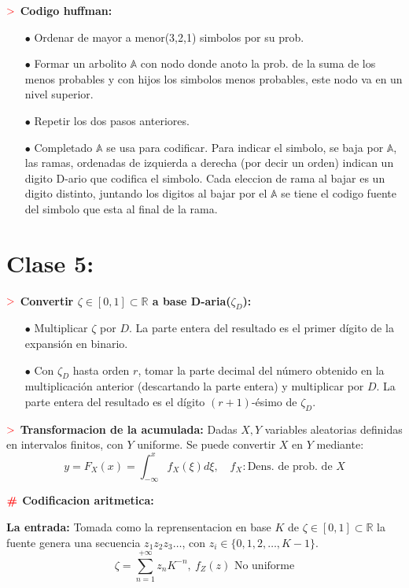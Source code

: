 \documentclass[%
 reprint,
 amsmath,amssymb,
 aps,
]{revtex4-1}
\begin{document}
\textbf{$\textcolor{red}{\mathbf{>}}$ Codigo huffman:} 
\begin{enumerate}
  \item[$\bullet$] Ordenar de mayor a menor(3,2,1) simbolos por su prob.
  \item[$\bullet$] Formar un arbolito $\mathbb{A}$ con nodo donde anoto la prob. de la suma de los menos probables y con hijos los simbolos menos probables, este nodo va en un nivel superior.
  \item[$\bullet$] Repetir los dos pasos anteriores.
  \item[$\bullet$] Completado $\mathbb{A}$ se usa para codificar. Para indicar el simbolo, se baja por $\mathbb{A}$, las ramas, ordenadas de izquierda a derecha (por decir un orden) indican un digito D-ario que codifica el simbolo. Cada eleccion de rama al bajar es un digito distinto, juntando los digitos al bajar por el $\mathbb{A}$ se tiene el codigo fuente del simbolo que esta al final de la rama.
\end{enumerate}

\section{Clase 5:}

\textbf{$\textcolor{red}{\mathbf{>}}$ Convertir $\zeta \in [0,1] \subset \mathbb{R}$ a base D-aria($\zeta_D$):}
\begin{itemize}
  \item[$\bullet$] Multiplicar $\zeta$ por $D$. La parte entera del resultado es el primer dígito de la expansión en binario.
  \item[$\bullet$] Con $\zeta_D$ hasta orden $r$, tomar la parte decimal del número obtenido en la multiplicación anterior (descartando la parte entera) y multiplicar por $D$. La parte entera del resultado es el dígito $(r+1)$-ésimo de $\zeta_D$.
\end{itemize}

\textbf{$\textcolor{red}{\mathbf{>}}$ Transformacion de la acumulada:}
Dadas $X, Y$ variables aleatorias definidas en intervalos finitos, con $Y$ uniforme. Se puede convertir $X$ en $Y$ mediante:
$$y = F_X(x) = \int_{-\infty}^x f_X (\xi) d\xi, \quad f_X: \text{Dens. de prob. de } X$$

\textbf{$\color{red}{\textbf{\#}}$ Codificacion aritmetica:} 

\textbf{La entrada:} 
Tomada como la reprensentacion en base $K$ de $\zeta \in [0,1] \subset \mathbb{R}$ la fuente genera una secuencia $z_{1} z_{2} z_{3} \ldots$, con $z_{i} \in\{0,1,2, \ldots, K-1\}$.
$$
\zeta=\sum_{n=1}^{+\infty} z_{n} K^{-n}, \ f_Z (z) \text{ No uniforme}
$$ 
\end{document}
